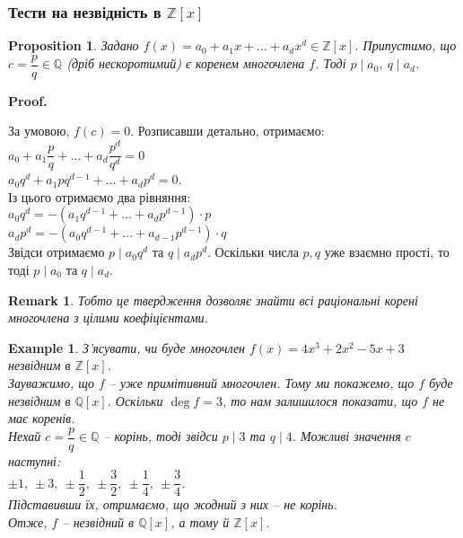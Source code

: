 \documentclass[a4paper, 10pt]{article}
\makeatletter
\theoremstyle{theoremdd}
\theoremstyle{theoremdd}
\theoremstyle{theoremdd}
\theoremstyle{theoremdd}
\theoremstyle{theoremdd}
\newtheorem{example}[theorem]{Example}
\theoremstyle{theoremdd}
\theoremstyle{theoremdd}
\theoremstyle{theoremdd}
\theoremstyle{theoremdd}
\newtheorem{proposition}[theorem]{Proposition}
\theoremstyle{theoremdd}
\theoremstyle{theoremdd}
\newtheorem{remark}[theorem]{Remark}
\theoremstyle{theoremdd}
\theoremstyle{theoremdd}
\theoremstyle{theoremdd}
\theoremstyle{theoremdd}
\renewenvironment{proof}[1][Proof.\\]{\par
\pushQED{\hfill \qed}%
\normalfont \topsep6\p@\@plus6\p@\relax
\trivlist
\item\relax
{\bfseries
#1\@addpunct{.}}\hspace\labelsep\ignorespaces
}{%
\popQED\endtrivlist\@endpefalse
}
\makeatother
\begin{document}
\subsubsection*{Тести на незвідність в $\mathbb{Z}[x]$}
\begin{proposition}
Задано $f(x) = a_0 + a_1 x + \dots + a_d x^d \in \mathbb{Z}[x]$. Припустимо, що $c = \dfrac{p}{q} \in \mathbb{Q}$ (дріб нескоротимий) є коренем многочлена $f$. Тоді $p \mid a_0,\ q \mid a_d$.
\end{proposition}

\begin{proof}
За умовою, $f(c) = 0$. Розписавши детально, отримаємо:\\
$a_0 + a_1 \dfrac{p}{q} + \dots + a_d \dfrac{p^d}{q^d} = 0$\\
$a_0 q^d + a_1 p q^{d-1} + \dots + a_d p^d = 0$.\\
Із цього отримаємо два рівняння:\\
$a_0 q^d = -(a_1 q^{d-1} + \dots + a_d p^{d-1}) \cdot p$\\
$a_d p^d = -(a_0 q^{d-1} + \dots + a_{d-1} p^{d-1}) \cdot q$\\
Звідси отримаємо $p \mid a_0 q^d$ та $q \mid a_d p^d$. Оскільки числа $p,q$ уже взаємно прості, то тоді $p \mid a_0$ та $q \mid a_d$.
\end{proof}

\begin{remark}
Тобто це твердження дозволяє знайти всі раціональні корені многочлена з цілими коефіцієнтами.
\end{remark}

\begin{example}
З'ясувати, чи буде многочлен $f(x) = 4x^3 + 2x^2 - 5x + 3$ незвідним в $\mathbb{Z}[x]$.\\
Зауважимо, що $f$ -- уже примітивний многочлен. Тому ми покажемо, що $f$ буде незвідним в $\mathbb{Q}[x]$. Оскільки $\deg f = 3$, то нам залишилося показати, що $f$ не має коренів.\\
Нехай $c = \dfrac{p}{q} \in \mathbb{Q}$ -- корінь, тоді звідси $p \mid 3$ та $q \mid 4$. Можливі значення $c$ наступні:\\
$\pm 1,\ \pm 3,\ \pm \dfrac{1}{2},\ \pm \dfrac{3}{2},\ \pm \dfrac{1}{4},\ \pm\dfrac{3}{4}$.\\
Підставивши їх, отримаємо, що жодний з них -- не корінь.\\
Отже, $f$ -- незвідний в $\mathbb{Q}[x]$, а тому й $\mathbb{Z}[x]$.
\end{example}
\end{document}
